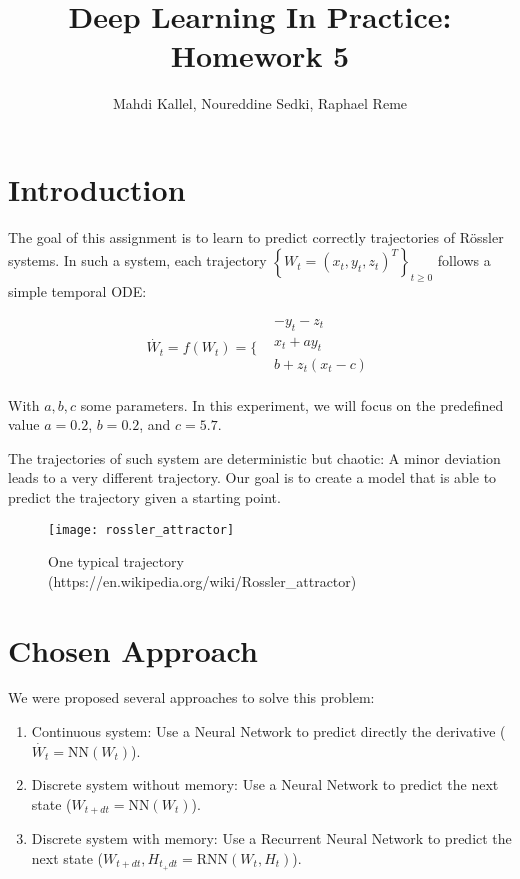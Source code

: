 \documentclass{article}
\title{Deep Learning In Practice: Homework 5}
\author{Mahdi Kallel, Noureddine Sedki, Raphael Reme}
\begin{document}
\maketitle

\section{Introduction}

The goal of this assignment is to learn to predict correctly trajectories of Rössler systems. In such a system, each trajectory
$\left\{W_t = (x_t, y_t, z_t)^T\right\}_{t \ge 0}$ follows a simple temporal ODE:

\begin{equation*}
    \dot{W_t} = f(W_t) = \Bigg\{ \begin{aligned}
         & - y_t - z_t     \\
         & x_t + ay_t      \\
         & b + z_t(x_t -c) \\
    \end{aligned}
\end{equation*}

With $a, b, c$ some parameters. In this experiment, we will focus on the predefined value $a=0.2$, $b=0.2$, and $c=5.7$.

The trajectories of such system are deterministic but chaotic: A minor deviation leads to a very different trajectory. Our goal is to create a
model that is able to predict the trajectory given a starting point.


\begin{figure}[h!]
    \centering
    \texttt{[image: rossler\_attractor]}
    \caption{One typical trajectory \\(https://en.wikipedia.org/wiki/Rossler\_attractor)}
    \label{fig:typical}
\end{figure}

\section{Chosen Approach}
We were proposed several approaches to solve this problem:
\begin{enumerate}
    \item Continuous system: Use a Neural Network to predict directly the derivative ($\dot{W_t} = \text{NN}(W_t)$).
    \item Discrete system without memory: Use a Neural Network to predict the next state ($W_{t + dt} = \text{NN}(W_t)$).
    \item Discrete system with memory: Use a Recurrent Neural Network to predict the next state ($W_{t + dt}, H_{t_+dt} = \text{RNN}(W_t, H_t)$).
\end{enumerate}
\end{document}
